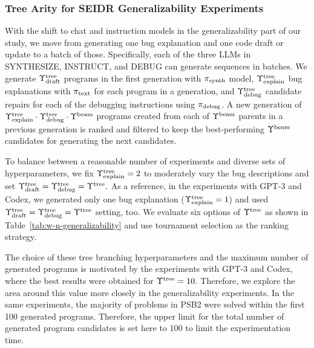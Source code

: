 \subsubsection{Tree Arity for SEIDR Generalizability Experiments}
\label{sec:seidr-tree arity-ollama} 
With the shift to chat and instruction models in the generalizability part of our study, we move from generating one bug explanation and one code draft or update to a batch of those. 
Specifically, each of the three LLMs in SYNTHESIZE, INSTRUCT, and DEBUG  can generate sequences in batches. 
We generate $\Upsilon^\text{tree}_\text{draft}$ programs in the first generation with $ \pi_\text{synth} $ model, $\Upsilon^\text{tree}_\text{explain}$ bug explanations with $ \pi_\text{text} $ for each program in a generation, and $\Upsilon^\text{tree}_\text{debug}$ candidate repairs for each of the debugging instructions using $ \pi_\text{debug} $.
A new generation of $\Upsilon^\text{tree}_\text{explain} \cdot \Upsilon^\text{tree}_\text{debug} \cdot \Upsilon^\text{beam}{}$ programs created from each of $ \Upsilon^\text{beam}{}$ parents in a previous generation is ranked and filtered to keep the best-performing $\Upsilon^\text{beam}{}$ candidates for generating the next candidates. 

To balance between a reasonable number of experiments and diverse sets of hyperparameters, we fix $\Upsilon^\text{tree}_\text{explain}=2$ to moderately vary the bug descriptions and set $\Upsilon^\text{tree}_\text{draft} = \Upsilon^\text{tree}_\text{debug} = \Upsilon^\text{tree}{}.$
As a reference, in the experiments with GPT-3 and Codex, we generated only one bug explanation ($\Upsilon^\text{tree}_\text{explain} = 1$) and used $\Upsilon^\text{tree}_\text{draft} = \Upsilon^\text{tree}_\text{debug} = \Upsilon^\text{tree}{}$ setting, too. 
We evaluate six options of $\Upsilon^\text{tree}{}$ 
as shown in Table~\ref{tab:w-n-generalizability} and use tournament selection as the ranking strategy. 

The choice of these tree branching hyperparameters and the maximum number of generated programs is motivated by the experiments with GPT-3 and Codex, where the best results were obtained for $\Upsilon^\text{tree}{}=10.$ 
Therefore, we explore the area around this value more closely in the generalizability experiments.
In the same experiments, the majority of problems in PSB2 were solved within the first 100 generated programs.
Therefore, the upper limit for the total number of generated program candidates is set here to 100 to limit the experimentation time.


